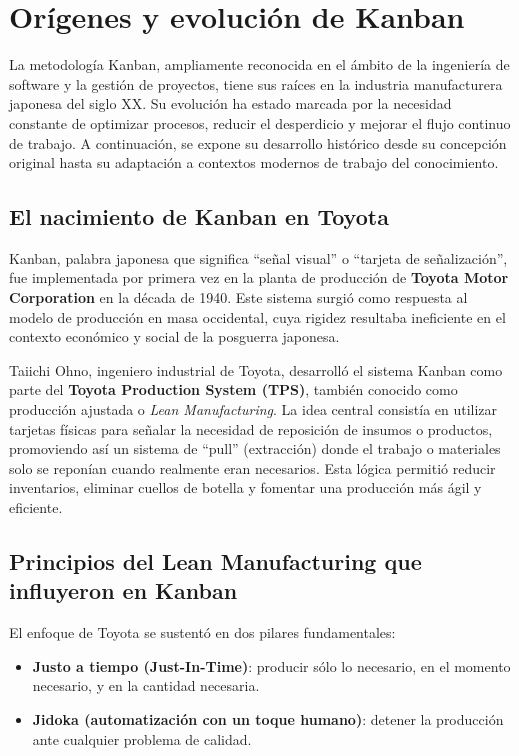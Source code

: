 \section{Orígenes y evolución de Kanban}

La metodología Kanban, ampliamente reconocida en el ámbito de la ingeniería de software y la gestión de proyectos, tiene sus raíces en la industria manufacturera japonesa del siglo XX. Su evolución ha estado marcada por la necesidad constante de optimizar procesos, reducir el desperdicio y mejorar el flujo continuo de trabajo. A continuación, se expone su desarrollo histórico desde su concepción original hasta su adaptación a contextos modernos de trabajo del conocimiento.

\subsection{El nacimiento de Kanban en Toyota}

Kanban, palabra japonesa que significa ``señal visual'' o ``tarjeta de señalización'', fue implementada por primera vez en la planta de producción de \textbf{Toyota Motor Corporation} en la década de 1940. Este sistema surgió como respuesta al modelo de producción en masa occidental, cuya rigidez resultaba ineficiente en el contexto económico y social de la posguerra japonesa.

Taiichi Ohno, ingeniero industrial de Toyota, desarrolló el sistema Kanban como parte del \textbf{Toyota Production System (TPS)}, también conocido como producción ajustada o \textit{Lean Manufacturing}. La idea central consistía en utilizar tarjetas físicas para señalar la necesidad de reposición de insumos o productos, promoviendo así un sistema de ``pull'' (extracción) donde el trabajo o materiales solo se reponían cuando realmente eran necesarios. Esta lógica permitió reducir inventarios, eliminar cuellos de botella y fomentar una producción más ágil y eficiente.

\subsection{Principios del Lean Manufacturing que influyeron en Kanban}

El enfoque de Toyota se sustentó en dos pilares fundamentales:
\begin{itemize}
    \item \textbf{Justo a tiempo (Just-In-Time)}: producir sólo lo necesario, en el momento necesario, y en la cantidad necesaria.
    \item \textbf{Jidoka (automatización con un toque humano)}: detener la producción ante cualquier problema de calidad.
\end{itemize}

